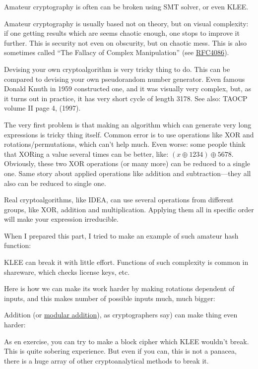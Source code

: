 Amateur cryptography is often can be broken using SMT solver, or even KLEE.

Amateur cryptography is usually based not on theory, but on visual complexity: if one getting results which are seems chaotic enough, one stops to improve it further.
This is security not even on obscurity, but on chaotic mess.
This is also sometimes called ``The Fallacy of Complex Manipulation'' (see \href{https://tools.ietf.org/html/rfc4086}{RFC4086}).

Devising your own cryptoalgorithm is very tricky thing to do.
This can be compared to devising your own pseudorandom number generator.
Even famous Donald Knuth in 1959 constructed one, and it was visually very complex, but, as it turns out in practice, it has very short cycle of length 3178.
See also: TAOCP volume II page 4, (1997).

The very first problem is that making an algorithm which can generate very long expressions is tricky thing itself.
Common error is to use operations like XOR and rotations/permutations, which can't help much.
Even worse: some people think that XORing a value several times can be better, like: $(x \oplus 1234) \oplus 5678$.
Obviously, these two XOR operations (or many more) can be reduced to a single one.
Same story about applied operations like addition and subtraction---they all also can be reduced to single one.

Real cryptoalgorithms, like IDEA, can use several operations from different groups, like XOR, addition and multiplication.
Applying them all in specific order will make your expression irreducible.

When I prepared this part, I tried to make an example of such amateur hash function:



KLEE can break it with little effort.
Functions of such complexity is common in shareware, which checks license keys, etc.

Here is how we can make its work harder by making rotations dependent of inputs, and this makes number of possible inputs much, much bigger:



Addition (or \href{https://yurichev.com/blog/modulo/}{modular addition}), as cryptographers say) can make thing even harder:



As en exercise, you can try to make a block cipher which KLEE wouldn't break.
This is quite sobering experience.
But even if you can, this is not a panacea, there is a huge array of other cryptoanalytical methods to break it.

